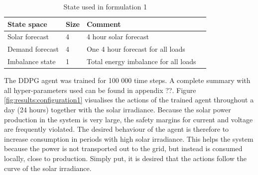 \documentclass[class=book, crop=false]{standalone}
\begin{document}
\begin{table}[ht]
\centering
\caption{State used in formulation 1}
\label{table:results:state_formulation1}
\begin{tabular}{l|lll}

State space  & Size & Comment
\\ 
\hline
Solar forecast      &  4  &  4 hour solar forecast
\\ 

Demand forecast    &4 & One 4 hour forecast for all loads
\\ 
Imbalance state & 1  & Total energy imbalance for all loads
\\
\hline
\end{tabular}
\end{table}
The DDPG agent was trained for 100 000 time steps. A complete summary with all hyper-parameters used can be found in appendix ??. Figure \ref{fig:results:configuration1} visualises the actions of the trained agent throughout a day (24 hours) together with the solar irradiance. Because the solar power production in the system is very large, the safety margins for current and voltage are frequently violated. The desired behaviour of the agent is therefore to increase consumption in periods with high solar irradiance. This helps the system because the power is not transported out to the grid, but instead is consumed locally, close to production. Simply put, it is desired that the actions follow the curve of the solar irradiance. 
\end{document}
